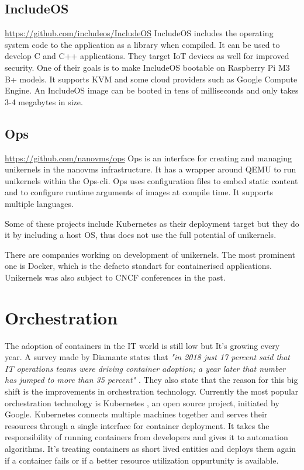 \subsection*{IncludeOS}
\url{https://github.com/includeos/IncludeOS} \cite{7396164}
IncludeOS includes the operating system code to the application as a library when compiled. It can be used to develop C and C++ applications. They target IoT devices as well for improved security. One of their goals is to make IncludeOS bootable on Raspberry Pi M3 B+ models. It supports KVM and some cloud providers such as Google Compute Engine. An IncludeOS image can be booted in tens of milliseconds and only takes 3-4 megabytes in size.

\subsection*{Ops}
\url{https://github.com/nanovms/ops}
  Ops is an interface for creating and managing unikernels in the nanovms infrastructure. \cite{nanovms} It has a wrapper around QEMU\cite{qemu} to run unikernels within the Ops-cli. Ops uses configuration files to embed static content and to configure runtime arguments of images at compile time. It supports multiple languages.
\newline

Some of these projects include Kubernetes as their deployment target but they do it by including a host OS, thus does not use the full potential of unikernels.

There are companies working on development of unikernels. The most prominent one is Docker, which is the defacto standart for containerised applications. \cite{francia_2016} Unikernels was also subject to CNCF conferences in the past.

\section{Orchestration}
The adoption of containers in the IT world is still low but It's growing every year. A survey made by Diamante states that \textit{"in 2018 just 17 percent said that IT operations teams were driving container adoption; a year later that number has jumped to more than 35 percent"} \cite{diamante}. They also state that the reason for this big shift is the improvements in orchestration technology. Currently the most popular orchestration technology is Kubernetes , an open source project, initiated by Google. Kubernetes connects multiple machines together and serves their resources through a single interface for container deployment. It takes the responsibility of running containers from developers and gives it to automation algorithms. It's treating containers as short lived entities and deploys them again if a container fails or if a better resource utilization oppurtunity is available.

